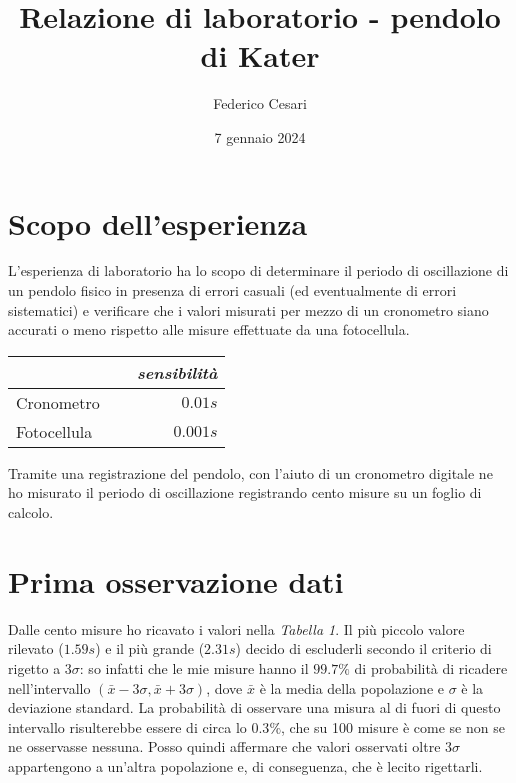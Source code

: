 \documentclass{article}
\title{Relazione di laboratorio - pendolo di Kater}
\author{Federico Cesari}
\date{7 gennaio 2024}
\begin{document}
	

	
	\section{Scopo dell'esperienza}
	L'esperienza di laboratorio ha lo scopo di determinare il periodo di oscillazione di un pendolo fisico in presenza di errori casuali (ed eventualmente di errori sistematici) e verificare che i valori misurati per mezzo di un cronometro siano accurati o meno rispetto alle misure effettuate da una fotocellula. 
	
	\vspace{0.5cm}
	\begin{table}[H]
		\centering
		\renewcommand{\arraystretch}{1.5}
		\begin{tabular}{lr}
			 & \textit{sensibilità}\\
			 \hline
			Cronometro $\quad$                	& $0.01s$    \\
			Fotocellula  $\quad$                & $0.001s$    \\
		\end{tabular}
		\renewcommand{\arraystretch}{1}
	\end{table}
	\vspace{0.5cm}
	
	Tramite una registrazione del pendolo, con l'aiuto di un cronometro digitale ne ho misurato il periodo di oscillazione registrando cento misure su un foglio di calcolo. 
	
	
	

	\section{Prima osservazione dati}
	
	Dalle cento misure ho ricavato i valori nella \textit{Tabella 1}. Il più piccolo valore rilevato ($1.59s$) e il più grande ($2.31s$) decido di escluderli secondo il criterio di rigetto a $3\sigma$: so infatti che le mie misure hanno il $99.7 \%$ di probabilità di ricadere nell'intervallo $(\bar{x}  - 3\sigma , \bar{x} + 3\sigma)$, dove $\bar{x}$ è la media della popolazione e $\sigma$ è la deviazione standard. La probabilità di osservare una misura al di fuori di questo intervallo risulterebbe essere di circa lo $0.3\%$, che su 100 misure è come se non  se ne osservasse nessuna. Posso quindi affermare che valori osservati oltre $3 \sigma$ appartengono a un'altra popolazione e, di conseguenza, che è lecito rigettarli. 
	
\end{document}
